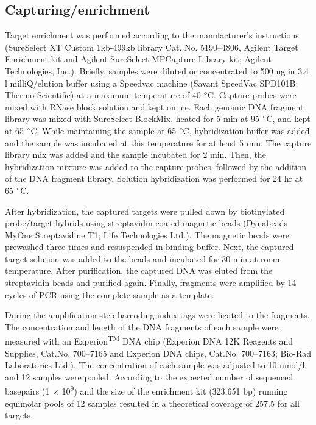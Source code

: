 \subsection{Capturing/enrichment}
Target enrichment was performed according to the manufacturer’s instructions (SureSelect XT Custom 1kb-499kb library Cat. No. 5190–4806, Agilent Target Enrichment kit and Agilent SureSelect MPCapture Library kit; Agilent Technologies, Inc.).
Briefly, samples were diluted or concentrated to 500 ng in 3.4 {\textmu}l milliQ/elution buffer using a Speedvac machine (Savant SpeedVac SPD101B; Thermo Scientific) at a maximum temperature of 40 $\degree$C. 
Capture probes were mixed with RNase block solution and kept on ice. 
Each genomic DNA fragment library was mixed with SureSelect BlockMix, heated for 5 min at 95 $\degree$C, and kept at 65 $\degree$C. While maintaining the sample at 65 $\degree$C, hybridization buffer was added and the sample was incubated at this temperature for at least 5 min. 
The capture library mix was added and the sample incubated for 2 min. 
Then, the hybridization mixture was added to the capture probes, followed by the addition of the DNA fragment library. 
Solution hybridization was performed for 24 hr at 65 $\degree$C. 

After hybridization, the captured targets were pulled down by biotinylated probe/target hybrids using streptavidin-coated magnetic beads (Dynabeads MyOne Streptavidine T1; Life Technologies Ltd.). 
The magnetic beads were prewashed three times and resuspended in binding buffer. 
Next, the captured target solution was added to the beads and incubated for 30 min at room temperature. 
After purification, the captured DNA was eluted from the streptavidin beads and purified again. 
Finally, fragments were amplified by 14 cycles of PCR using the complete sample as a template. 

During the amplification step barcoding index tags were ligated to the fragments. 
The concentration and length of the DNA fragments of each sample were measured with an Experion\textsuperscript{TM} DNA chip (Experion DNA 12K Reagents and Supplies, Cat.No. 700–7165 and Experion DNA chips, Cat.No. 700–7163; Bio-Rad Laboratories Ltd.). 
The concentration of each sample was adjusted to 10 nmol/l, and 12 samples were pooled. 
According to the expected number of sequenced basepairs (1 $\times$ 10\textsuperscript{9}) and the size of the enrichment kit (323,651 bp) running equimolar pools of 12 samples resulted in a theoretical coverage of 257.5 for all targets.

